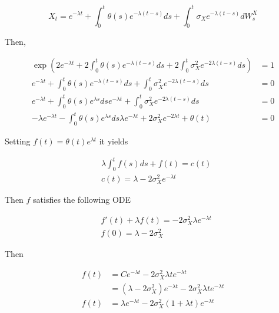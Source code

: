 \documentclass{article}
\begin{document}
\begin{equation}
	X_t = e^{-\lambda t} + \int_{0}^t \theta(s) e^{-\lambda (t-s)} ds + \int_0^t \sigma_X e^{-\lambda(t-s)} dW_s^X
\end{equation}

\noindent Then,

\begin{equation*}
\begin{aligned}
	\exp\left(2e^{-\lambda t} + 2\int_{0}^t \theta(s) e^{-\lambda (t-s)} ds + 2\int_0^t \sigma_X^2 e^{-2\lambda(t-s)} ds\right) &= 1\\
	e^{-\lambda t} + \int_{0}^t \theta(s) e^{-\lambda (t-s)} ds + \int_0^t \sigma_X^2 e^{-2\lambda(t-s)} ds &= 0\\
	e^{-\lambda t} + \int_{0}^t \theta(s) e^{\lambda s} ds e^{-\lambda t} + \int_0^t \sigma_X^2 e^{-2\lambda(t-s)} ds &= 0\\
	-\lambda e^{-\lambda t} - \int_{0}^t \theta(s) e^{\lambda s} ds \lambda e^{-\lambda t} + 2 \sigma_X^2 e^{-2\lambda t} + \theta(t) &= 0
\end{aligned}
\end{equation*}

Setting $f(t) = \theta(t) e^{\lambda t}$ it yields

\begin{equation}
\begin{aligned}
	&\lambda \int_0^t f(s) ds + f(t) = c(t)\\
	&c(t) = \lambda - 2\sigma_X^2 e^{-\lambda t}
\end{aligned}
\end{equation}

\noindent Then $f$ satisfies the following ODE

\begin{equation}
\begin{aligned}
	& f'(t) + \lambda f(t) = -2 \sigma_X^2 \lambda e^{-\lambda t}\\
	&f(0) = \lambda - 2\sigma_X^2
\end{aligned}
\end{equation}

\noindent Then

\begin{equation}
\begin{aligned}
	f(t) &= Ce^{-\lambda t} - 2 \sigma_X^2 \lambda t e^{-\lambda t}\\
	&= \left(\lambda - 2\sigma_X^2 \right) e^{-\lambda t} - 2 \sigma_X^2 \lambda t e^{-\lambda t}\\
	f(t) &= \lambda e^{-\lambda t} - 2\sigma_X^2 (1 + \lambda t) e^{-\lambda t}
\end{aligned}
\end{equation}
\end{document}
